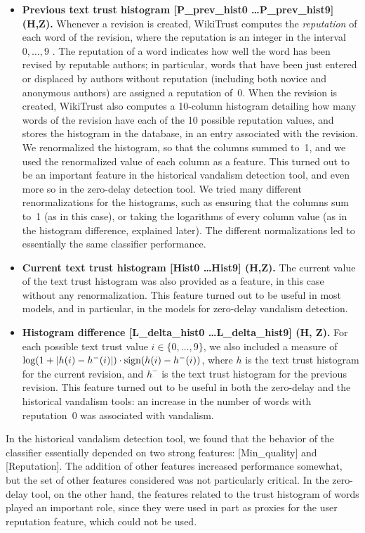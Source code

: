\begin{itemize}
\item \textbf{Previous text trust histogram [P\_prev\_hist0 \ldots P\_prev\_hist9] (H,Z).}
Whenever a revision is created, WikiTrust computes the {\em reputation\/} of each word of the revision, where the reputation is an integer in the interval $0, \ldots, 9$ \cite{WikiTrust08}.
The reputation of a word indicates how well the word has been revised by reputable authors; in particular, words that have been just entered or displaced by authors without reputation (including both novice and anonymous authors) are assigned a reputation of~0.
When the revision is created, WikiTrust also computes a 10-column histogram detailing how many words of the revision have each of the 10 possible reputation values, and stores the histogram in the database, in an entry associated with the revision.
We renormalized the histogram, so that the columns summed to~1, and we used the renormalized value of each column as a feature.
This turned out to be an important feature in the historical vandalism detection tool, and even more so in the zero-delay detection tool.
We tried many different renormalizations for the histograms, such as ensuring that the columns sum to~1 (as in this case), or taking the logarithms of every column value (as in the histogram difference, explained later).
The different normalizations led to essentially the same classifier performance.

\item \textbf{Current text trust histogram [Hist0 \ldots Hist9] (H,Z).}  The current value of the text trust histogram was also provided as a feature, in this case without any renormalization.
This feature turned out to be useful in most models, and in particular, in the models for zero-delay vandalism detection.

\item \textbf{Histogram difference [L\_delta\_hist0 \ldots L\_delta\_hist9] (H, Z).}  For each possible text trust value $i \in \{0, \ldots, 9\}$, we also included a measure of $\log(1 + |h(i) - h^{-}(i)|) \cdot {{\textrm{sign}}}(h(i) - h^{-}(i))$, where $h$ is the text trust histogram for the current revision, and $h^{-}$ is the text trust histogram for the previous revision.
This feature turned out to be useful in both the zero-delay and the historical vandalism tools: an increase in the number of words with reputation~0 was associated with vandalism.

\end{itemize}
%
In the historical vandalism detection tool, we found that the behavior of the classifier essentially depended on two strong features: [Min\_quality] and [Reputation].  The addition of other features increased performance somewhat, but the set of other features considered was not particularly critical.
In the zero-delay tool, on the other hand, the features related to the trust histogram of words played an important role, since they were used in part as proxies for the user reputation feature, which could not be used.

